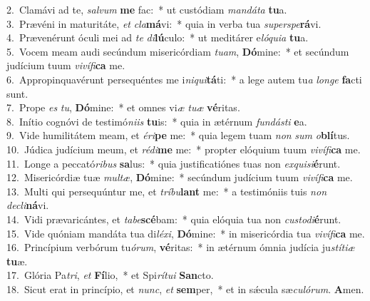 {2.~}Clamávi ad te, \textit{sal}\textit{vum} \textbf{me} fac:~* ut custódiam \textit{man}\textit{dá}\textit{ta} \textbf{tu}a.\\
{3.~}Prævéni in maturitáte, \textit{et} \textit{cla}\textbf{má}vi:~* quia in verba tua \textit{su}\textit{per}\textit{spe}\textbf{rá}vi.\\
{4.~}Prævenérunt óculi mei ad \textit{te} \textit{di}\textbf{lú}culo:~* ut meditárer e\textit{ló}\textit{qui}\textit{a} \textbf{tu}a.\\
{5.~}Vocem meam audi secúndum misericórdiam \textit{tu}\textit{am}, \textbf{Dó}mine:~* et secúndum judícium tuum \textit{vi}\textit{ví}\textit{fi}\textbf{ca} me.\\
{6.~}Appropinquavérunt persequéntes me i\textit{ni}\textit{qui}\textbf{tá}ti:~* a lege autem tu\textit{a} \textit{lon}\textit{ge} \textbf{fa}cti sunt.\\
{7.~}Prope \textit{es} \textit{tu}, \textbf{Dó}mine:~* et omnes vi\textit{æ} \textit{tu}\textit{æ} \textbf{vé}ritas.\\
{8.~}Inítio cognóvi de testimó\textit{ni}\textit{is} \textbf{tu}is:~* quia in ætérnum \textit{fun}\textit{dá}\textit{sti} \textbf{e}a.\\
{9.~}Vide humilitátem meam, et \textit{é}\textit{ri}\textbf{pe} me:~* quia legem tuam \textit{non} \textit{sum} \textit{o}\textbf{blí}tus.\\
{10.~}Júdica judícium meum, et \textit{ré}\textit{di}\textbf{me} me:~* propter elóquium tuum \textit{vi}\textit{ví}\textit{fi}\textbf{ca} me.\\
{11.~}Longe a peccató\textit{ri}\textit{bus} \textbf{sa}lus:~* quia justificatiónes tuas non \textit{ex}\textit{qui}\textit{si}\textbf{é}runt.\\
{12.~}Misericórdiæ tuæ \textit{mul}\textit{tæ}, \textbf{Dó}mine:~* secúndum judícium tuum \textit{vi}\textit{ví}\textit{fi}\textbf{ca} me.\\
{13.~}Multi qui persequúntur me, et \textit{trí}\textit{bu}\textbf{lant} me:~* a testimóniis tuis \textit{non} \textit{de}\textit{cli}\textbf{ná}vi.\\
{14.~}Vidi prævaricántes, et \textit{ta}\textit{be}\textbf{scé}bam:~* quia elóquia tua non \textit{cu}\textit{sto}\textit{di}\textbf{é}runt.\\
{15.~}Vide quóniam mandáta tua di\textit{lé}\textit{xi}, \textbf{Dó}mine:~* in misericórdia tua \textit{vi}\textit{ví}\textit{fi}\textbf{ca} me.\\
{16.~}Princípium verbórum tu\textit{ó}\textit{rum}, \textbf{vé}ritas:~* in ætérnum ómnia judícia ju\textit{stí}\textit{ti}\textit{æ} \textbf{tu}æ.\\
{17.~}Glória Pa\textit{tri}, \textit{et} \textbf{Fí}lio,~* et Spi\textit{rí}\textit{tu}\textit{i} \textbf{San}cto.\\
{18.~}Sicut erat in princípio, et \textit{nunc}, \textit{et} \textbf{sem}per,~* et in sǽcula sæ\textit{cu}\textit{ló}\textit{rum}. \textbf{A}men.\\

